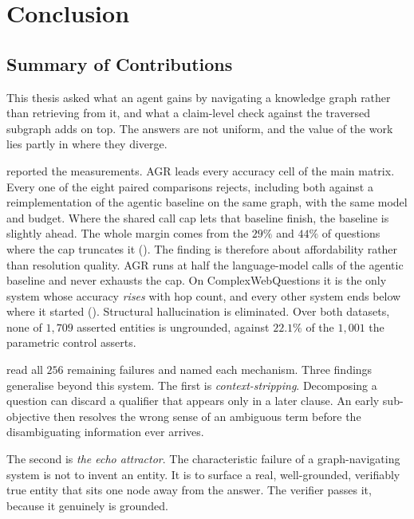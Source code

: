 \chapter{Conclusion}\label{ch:conclusion}

\section{Summary of Contributions}\label{sec:summary}

This thesis asked what an agent gains by navigating a knowledge graph rather
than retrieving from it, and what a claim-level check against the traversed
subgraph adds on top. The answers are not uniform, and the value of the work
lies partly in where they diverge.

 reported the measurements. AGR leads every accuracy cell of
the main matrix. Every one of the eight paired comparisons rejects, including
both against a reimplementation of the agentic baseline on the same graph, with
the same model and budget. Where the shared call cap lets that baseline finish,
the baseline is slightly ahead. The whole margin comes from the $29\%$ and
$44\%$ of questions where the cap truncates it (). The
finding is therefore about affordability rather than resolution quality. AGR
runs at half the language-model calls of the agentic baseline and never exhausts
the cap. On ComplexWebQuestions it is the only system whose accuracy
\emph{rises} with hop count, and every other system ends below where it started
(). Structural hallucination is eliminated. Over both
datasets, none of $1{,}709$ asserted entities is ungrounded, against $22.1\%$ of
the $1{,}001$ the parametric control asserts.

 read all $256$ remaining failures and named each
mechanism. Three findings generalise beyond this system. The first is
\emph{context-stripping}. Decomposing a question can discard a qualifier that
appears only in a later clause. An early sub-objective then resolves the wrong
sense of an ambiguous term before the disambiguating information ever arrives.

The second is \emph{the echo attractor}. The characteristic failure of a
graph-navigating system is not to invent an entity. It is to surface a real,
well-grounded, verifiably true entity that sits one node away from the answer.
The verifier passes it, because it genuinely is grounded.

